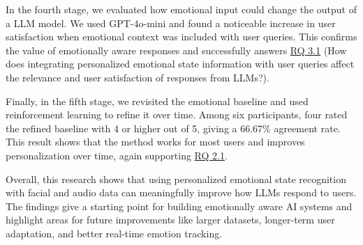 \par In the fourth stage, we evaluated how emotional input could change the output of a LLM model. We used GPT-4o-mini and found a noticeable increase in user satisfaction when emotional context was included with user queries. This confirms the value of emotionally aware responses and successfully answers \hyperref[rq:3.1]{RQ 3.1} (How does integrating personalized emotional state information with user queries affect the relevance and user satisfaction of responses from LLMs?).

\par Finally, in the fifth stage, we revisited the emotional baseline and used reinforcement learning to refine it over time. Among six participants, four rated the refined baseline with 4 or higher out of 5, giving a 66.67\% agreement rate. This result shows that the method works for most users and improves personalization over time, again supporting \hyperref[rq:2.1]{RQ 2.1}.

\par Overall, this research shows that using personalized emotional state recognition with facial and audio data can meaningfully improve how LLMs respond to users. The findings give a starting point for building emotionally aware AI systems and highlight areas for future improvements like larger datasets, longer-term user adaptation, and better real-time emotion tracking.
